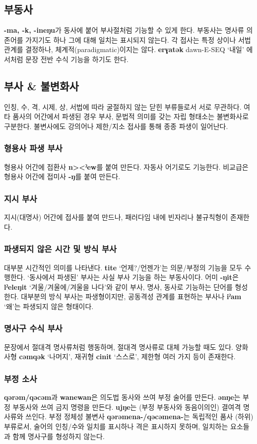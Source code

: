 \subsection{부동사}
\textbf{-ma, -k, -ineŋu}가 동사에 붙어 부사절처럼 기능할 수 있게 한다. 부동사는 명사류 의존어를 가지기도 하나 그에 대해 일치는 표시되지 않는다. 각 접사는 특정 상이나 서법 관계를 결정하나, 체계적(paradigmatic)이지는 않다. \textbf{erɣatək} dawn-E-SEQ `내일' 에서처럼 문장 전반 수식 기능을 하기도 한다.
\subsection{부사 \& 불변화사}
인칭, 수, 격, 시제, 상, 서법에 따라 굴절하지 않는 닫힌 부류들로서 서로 무관하다. 여타 품사의 어간에서 파생된 경우 부사, 문법적 의미를 갖는 자립 형태소는 불변화사로 구분한다. 불변사에도 강의어나 제한/지소 접사를 통해 종종 파생이 일어난다.
\subsubsection{형용사 파생 부사}
형용사 어간에 접환사 \textbf{n><ˀew}를 붙여 만든다. 자동사 어기로도 기능한다. 비교급은 형용사 어간에 접미사 \textbf{-ŋ}를 붙여 만든다.
\subsubsection{지시 부사}
지시(대명사) 어간에 접사를 붙여 만드나, 패러다임 내에 빈자리나 불규칙형이 존재한다.
\subsubsection{파생되지 않은 시간 및 방식 부사}
대부분 시간적인 의미를 나타낸다. \textbf{tite} `언제?/언젠가'는 의문/부정의 기능을 모두 수행한다. `동사에서 파생된' 부사는 사실 부사 기능을 하는 부동사이다. 어미 \textbf{-ŋit}은 \textbf{lˀeleŋit} `겨울/겨울에/겨울을 나다'와 같이 부사, 명사, 동사로 기능하는 단어를 형성한다. 대부분의 방식 부사는 파생형이지만, 공동격성 관계를 표현하는 부사나 \textbf{iˀam} `왜'는 파생되지 않은 형태이다.
\subsubsection{명사구 수식 부사}
문장에서 절대격 명사류처럼 행동하며, 절대격 명사류로 대체 가능할 때도 있다. 양화사형 \textbf{cəmqək} `나머지', 재귀형 \textbf{cinit} `스스로', 제한형 여러 가지 등이 존재한다. 
\subsubsection{부정 소사}
\textbf{qərəm/qəcəm}과 \textbf{wanewan}은 의도법 동사와 쓰여 부정 술어를 만든다. \textbf{ənŋe}는 부정 부동사와 쓰여 금지 명령을 만든다. \textbf{ujŋe}는 (부정 부동사와 동음이의인) 결여격 명사류와 쓰인다. 부정 정체성 불변사 \textbf{qərəmena-/qəcəmena-}는 독립적인 품사 (하위)부류로서, 술어의 인칭/수와 일치를 표시하나 격은 표시하지 못하며, 일치하는 요소들과 함께 명사구를 형성하지 않는다.
